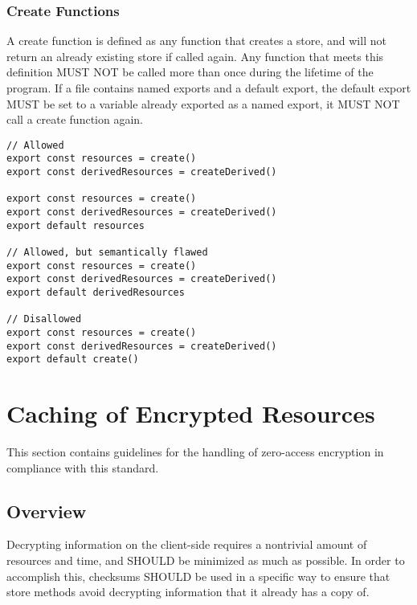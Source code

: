 \documentclass{article}
\begin{document}
\subsubsection{Create Functions}
A create function is defined as any function that creates a store, and will not return an already existing store if called again. Any function that meets this definition MUST NOT be called more than once during the lifetime of the program. If a file contains named exports and a default export, the default export MUST be set to a variable already exported as a named export, it MUST NOT call a create function again. 

\newpage
\begin{lstlisting}[caption=Usage of Create Functions and Named Exports]
// Allowed
export const resources = create()
export const derivedResources = createDerived()

export const resources = create()
export const derivedResources = createDerived()
export default resources

// Allowed, but semantically flawed
export const resources = create()
export const derivedResources = createDerived()
export default derivedResources

// Disallowed
export const resources = create()
export const derivedResources = createDerived()
export default create()
\end{lstlisting}

\section{Caching of Encrypted Resources}
This section contains guidelines for the handling of zero-access encryption in compliance with this standard.

\subsection{Overview}
Decrypting information on the client-side requires a nontrivial amount of resources and time, and SHOULD be minimized as much as possible. In order to accomplish this, checksums SHOULD be used in a specific way to ensure that store methods avoid decrypting information that it already has a copy of.
\end{document}
